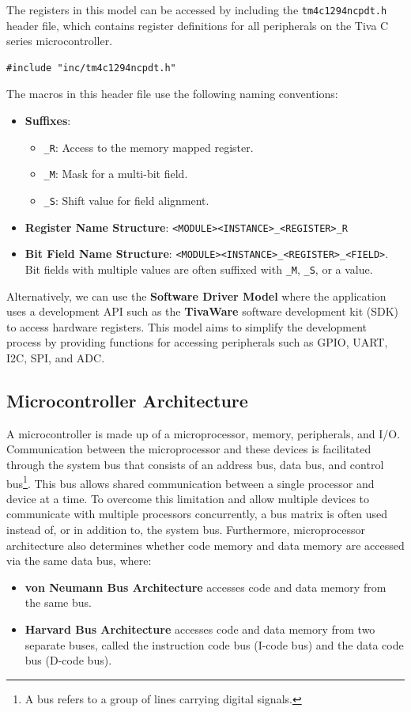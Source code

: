 \documentclass{article}
\begin{document}
The registers in this model can be accessed by including the
\texttt{tm4c1294ncpdt.h} header file, which contains register
definitions for all peripherals on the Tiva C series microcontroller.
\begin{verbatim}
#include "inc/tm4c1294ncpdt.h"
\end{verbatim}
The macros in this header file use the following naming conventions:
\begin{itemize}
    \item \textbf{Suffixes}:
          \begin{itemize}
              \item \texttt{_R}: Access to the memory mapped register.
              \item \texttt{_M}: Mask for a multi-bit field.
              \item \texttt{_S}: Shift value for field alignment.
          \end{itemize}
    \item \textbf{Register Name Structure}: \texttt{<MODULE><INSTANCE>_<REGISTER>_R}
    \item \textbf{Bit Field Name Structure}: \texttt{<MODULE><INSTANCE>_<REGISTER>_<FIELD>}. Bit fields
          with multiple values are often suffixed with \texttt{_M}, \texttt{_S}, or a value.
\end{itemize}
Alternatively, we can use the \textbf{Software Driver Model} where the
application uses a development API such as the \textbf{TivaWare}
software development kit (SDK) to access hardware registers. This model
aims to simplify the development process by providing functions for
accessing peripherals such as GPIO, UART, I2C, SPI, and ADC.
\subsection{Microcontroller Architecture}
A microcontroller is made up of a microprocessor, memory, peripherals,
and I/O. Communication between the microprocessor and these devices is
facilitated through the system bus that consists of an address bus,
data bus, and control bus\footnote{A bus refers to a group of lines
carrying digital signals.}. This bus allows shared communication
between a single processor and device at a time. To overcome this
limitation and allow multiple devices to communicate with multiple
processors concurrently, a bus matrix is often used instead of, or in
addition to, the system bus. Furthermore, microprocessor architecture
also determines whether code memory and data memory are accessed via
the same data bus, where:
\begin{itemize}
    \item \textbf{von Neumann Bus Architecture} accesses code and data memory from the same bus.
    \item \textbf{Harvard Bus Architecture} accesses code and data memory from two separate buses, called the instruction code bus (I-code bus) and the data code bus (D-code bus).
\end{itemize}
\end{document}
